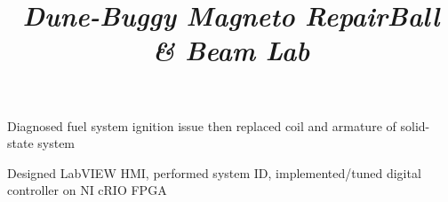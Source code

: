 \documentclass[mm]{res}
\begin{document}
\begin{resume}


\title{\textsl{Dune-Buggy Magneto Repair}}
\begin{position}
\tb Diagnosed fuel system ignition issue then replaced coil and armature of solid-state system
\end{position}

\title{\textsl{Ball \& Beam Lab}}
\begin{position}
\tb Designed LabVIEW HMI, performed system ID, implemented/tuned digital controller on NI cRIO FPGA
\end{position}





\end{resume}
\end{document}
